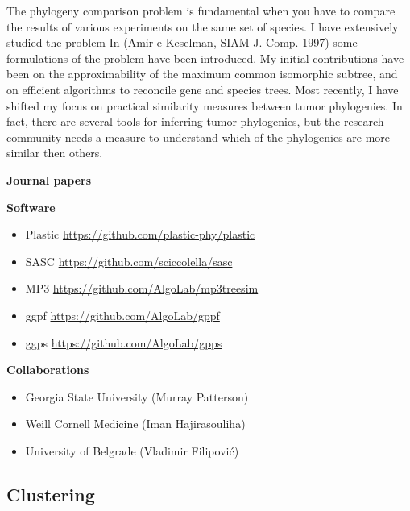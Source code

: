 \documentclass[11pt,a4paper,roman]{moderncv}
\begin{document}
The phylogeny comparison problem is fundamental when you have to compare
the results of various experiments on the same set of species. I have
extensively studied the problem In (Amir e Keselman, SIAM J. Comp. 1997)
some formulations of the problem have been introduced. My initial contributions
have been on the approximability of the maximum common isomorphic
subtree, and on efficient algorithms to reconcile gene and species trees.
Most recently, I have shifted my focus on practical similarity measures between
tumor phylogenies.
In fact, there are several tools for inferring tumor phylogenies, but the
research community needs a measure to understand which of the phylogenies are
more similar then others.


\textbf{Journal papers}

\cite{a16070333}
\cite{DBLP:journals/jcb/AliCLVP21}
\cite{DBLP:journals/bioinformatics/CiccolellaRGPSB21}
\cite{DBLP:journals/bioinformatics/CiccolellaBDBPV21}
\cite{DBLP:journals/bmcbi/CiccolellaGPVHB20}
\cite{DBLP:journals/tcbb/BonizzoniCVS19}
\cite{DBLP:journals/tcs/BonizzoniCVRT17}
\cite{DBLP:journals/fuin/BonizzoniCVRT17}
\cite{bonizzoniExplainingEvolutionConstrained2014}
\cite{DBLP:journals/tcs/BonizzoniVD05}
\cite{DBLP:journals/bioinformatics/VedovaW02}
\cite{DBLP:journals/ijfcs/BonizzoniVM00}


\textbf{Software}

\begin{itemize}
	\item
	      Plastic \url{https://github.com/plastic-phy/plastic}
	\item
	      SASC \url{https://github.com/sciccolella/sasc}
	\item
	      MP3 \url{https://github.com/AlgoLab/mp3treesim}
	\item
	      ggpf \url{https://github.com/AlgoLab/gppf}
	\item
	      ggps \url{https://github.com/AlgoLab/gpps}
\end{itemize}

\textbf{Collaborations}

\begin{itemize}
	\item
	      Georgia State University (Murray Patterson)
	\item
	      Weill Cornell Medicine (Iman Hajirasouliha)
	\item
	      University of Belgrade (Vladimir Filipović)
\end{itemize}

\subsection{Clustering}\label{clustering}
\end{document}
